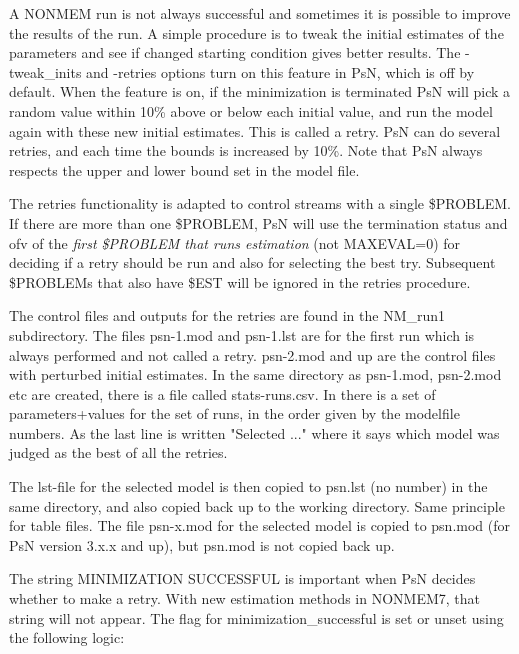 A NONMEM run is not always successful and sometimes it is possible to improve the results of the run. A simple procedure is to tweak the initial 
estimates of the parameters and see if changed starting condition gives better results. The -tweak\_inits and -retries options turn on this feature in PsN, 
which is off by default. When the feature is on, if the minimization is terminated PsN will pick a random value within 10\% above or below each initial value, 
and run the model again with these new initial estimates. This is called a retry. PsN can do several retries, and each time the bounds is 
increased by 10\%. Note that PsN always respects the upper and lower bound set in the model file. 

The retries functionality is adapted to control streams with a single \$PROBLEM. If there are more than one \$PROBLEM, PsN will
use the termination status and ofv of the \emph{first \$PROBLEM that runs estimation} (not MAXEVAL=0) for deciding if a retry should be run
and also for selecting the best try. Subsequent \$PROBLEMs that also have \$EST will be ignored in the retries procedure.

The control files and outputs for the retries are found in the NM\_run1 subdirectory. The files psn-1.mod and psn-1.lst are for 
the first run which is always performed and not called a retry. psn-2.mod and up are the control files with perturbed initial 
estimates. In the same directory as psn-1.mod, psn-2.mod etc are created, there is a file called stats-runs.csv. In there is a 
set of parameters+values for the set of runs, in the order given by the modelfile numbers. As the last line is 
written "Selected ..." where it says which model was judged as the best of all the retries.

The lst-file for the selected model is then copied to psn.lst (no number) in the same directory, and also copied back 
up to the working directory. Same principle for table files. The file psn-x.mod for the selected model is copied 
to psn.mod (for PsN version 3.x.x and up), but psn.mod is not copied back up.   	

The string MINIMIZATION SUCCESSFUL is important when PsN decides whether to make a retry. With new estimation 
methods in NONMEM7, that string will not appear. The flag for minimization\_successful is set or unset using the following logic:


